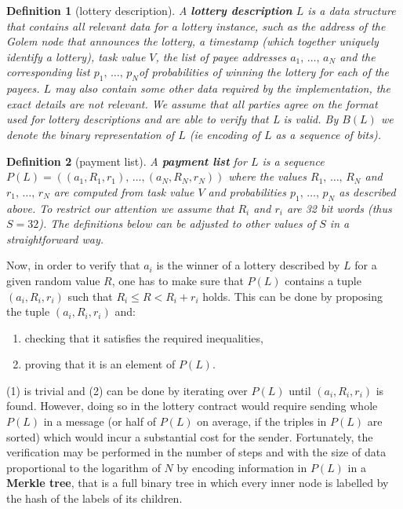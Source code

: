 \documentclass[a4paper]{article}
\newtheorem*{dfnt}{Definition}
\begin{document}
    \begin{dfnt}[lottery description]
        A \textbf{lottery description} $L$ is a data structure that contains all relevant data for a lottery instance,
        such as the address of the Golem node that announces the lottery, a timestamp (which together uniquely identify
        a lottery), task value $V$, the list of payee addresses $a_1,\,\ldots,\, a_N$ and the corresponding list
        $p_1, \,\ldots,\, p_N $of probabilities of winning the lottery for each of the payees. $L$ may also contain
        some other data required by the implementation, the exact details are not relevant. We assume that all parties
        agree on the format used for lottery descriptions and are able to verify that L is valid. By $B(L)$ we denote
        the binary representation of $L$ (ie encoding of $L$ as a sequence of bits).
    \end{dfnt}


    \begin{dfnt}[payment list]
        A \textbf{payment list} for $L$ is a sequence $P(L) = ((a_1, R_1, r_1), \,\ldots, (a_N, R_N, r_N))$ where the values
        $R_1,\,\ldots,\, R_N$ and $r_1,\,\ldots,\, r_N$ are computed from task value $V$ and probabilities
        $p_1,\,\ldots,\,p_N$ as described above. To restrict our attention we assume that $R_i$ and $r_i$ are 32 bit
        words (thus $S = 32$). The definitions below can be adjusted to other values of $S$ in a straightforward way.
    \end{dfnt}

    Now, in order to verify that $a_i$ is the winner of a lottery described by $L$ for a given random value $R$,
    one has to make sure that $P(L)$ contains a tuple $(a_i, R_i, r_i)$ such that $R_i \leq R < R_i + r_i$ holds.
    This can be done by proposing the tuple $(a_i, R_i, r_i)$ and:
    \begin{enumerate}
        \item checking that it satisfies the required inequalities,
        \item proving that it is an element of $P(L)$.
    \end{enumerate}

    (1) is trivial and (2) can be done by iterating over $P(L)$ until $(a_i, R_i, r_i)$ is found. However,
    doing so in the lottery contract would require sending whole $P(L)$ in a message (or half of $P(L)$ on average,
    if the triples in $P(L)$ are sorted) which would incur a substantial cost for the sender. Fortunately,
    the verification may be performed in the number of steps and with the size of data proportional to the logarithm
    of $N$ by encoding information in $P(L)$ in a \textbf{Merkle tree}, that is a full binary tree in which every inner node
    is labelled by the hash of the labels of its children.
\end{document}
